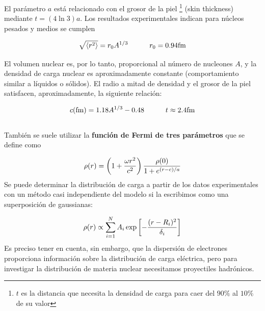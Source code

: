 El parámetro $a$ está relacionado con el grosor de la piel \footnote{$t$ es la distancia que necesita la densidad de carga para caer del $90\%$ al $10\%$ de su valor} (skin thickness) mediante $t=(4\ln 3)a$. Los resultados experimentales indican para núcleos pesados y medios se cumplen 

\begin{equation}
	\sqrt{\langle r^2 \rangle} = r_0 A^{1/3} \tquad r_0 = 0.94 \unit{\fm}
\end{equation}



El volumen nuclear es, por lo tanto, proporcional al número de nucleones $A$, y la densidad de carga nuclear es aproximadamente constante (comportamiento similar a líquidos o sólidos). El radio a mitad de densidad y el grosor de la piel satisfacen, aproximadamente, la siguiente relación:

\begin{equation}
    c(\unit{\fm}) = 1.18A^{1/3} - 0.48 \tquad t \approx 2.4 \unit{\fm}
\end{equation} \\

También se suele utilizar la \textbf{función de Fermi de tres parámetros} que se define como

\begin{equation}
    \rho (r) = \left( 1+ \frac{\omega r^2}{c^2} \right) \frac{\rho (0)}{1+e^{(r-c)/a}} 
\end{equation}
Se puede determinar la distribución de carga a partir de los datos experimentales con un método casi independiente del modelo si la escribimos como una superposición de gaussianas:

\begin{equation}
	\rho (r) \propto \sum_{i=1}^N A_i \exp \left[ - \frac{(r-R_i)^2}{\delta_i} \right]
\end{equation}
Es preciso tener en cuenta, sin embargo, que la dispersión de electrones proporciona información sobre la distribución de carga eléctrica, pero para investigar la distribución de materia nuclear necesitamos proyectiles hadrónicos.





